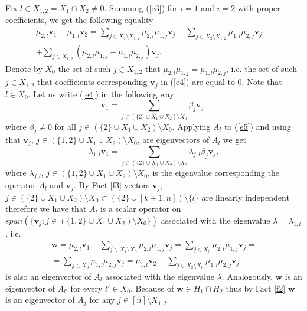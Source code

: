 \documentclass[12pt,nopagetitle]{article}
\theoremstyle{plain}
\theoremstyle{definition}
\begin{document}
Fix $l\in X_{1,2}=X_1\cap X_2\ne 0$. Summing (\ref{e3}) for $i=1$ and $i=2$ with proper coefficients, we get the following equality
\begin{multline}\label{e4}
		\mu_{2,l}\mathbf v_1 -\mu_{1,l}\mathbf v_2=\sum_{j\in X_1\setminus X_{1,2}} \mu_{2,l}\mu_{1,j} \mathbf v_j-\sum_{j\in X_2\setminus X_{1,2}} \mu_{1,l}\mu_{2,j} \mathbf v_j+\\
		+\sum_{j\in X_{1,2}}(\mu_{2,l}\mu_{1,j}-\mu_{1,l}\mu_{2,j}) \mathbf v_j.
\end{multline}
		Denote by $X_0$ the set of such $j\in X_{1,2}$ that $\mu_{2,l}\mu_{1,j}=\mu_{1,l}\mu_{2,j}$, i.e. the set of such $j\in X_{1,2}$ that coefficients corresponding $\mathbf v_j$ in (\ref{e4}) are equal to $0$. Note that $l\in X_0.$ 
		Let us write (\ref{e4}) in the following way
		\begin{equation}\label{e5}
		\mathbf v_1=\sum_{j\in (\{2\}\cup X_1\cup X_2)\setminus X_0} \beta_j \mathbf v_j,
		\end{equation}
		where $\beta_j\ne 0$ for all $j\in (\{2\}\cup X_1\cup X_2)\setminus X_0$. Applying $A_l$ to (\ref{e5}) and using that $\mathbf v_j$, $j\in (\{1,2\}\cup X_1\cup X_2)\setminus X_0$, are eigenvectors of $A_l$ we get
		$$\lambda_{1,l} \mathbf v_1=\sum_{j\in (\{2\}\cup X_1\cup X_2)\setminus X_0} \lambda_{j,l}\beta_j \mathbf v_j,$$
		where $\lambda_{j,l}$, $j\in (\{1,2\}\cup X_1\cup X_2)\setminus X_0$, is the eigenvalue corresponding the operator $A_l$ and $\mathbf v_j$.
		By Fact \ref{f3} vectors $\mathbf v_j$, $j\in (\{2\}\cup X_1\cup X_2)\setminus X_0\subset (\{2\}\cup [k+1,n])\setminus \{l\}$ are linearly independent therefore we have that
		$A_l$ is a scalar operator on $span (\{\mathbf v_j: j\in (\{1,2\}\cup X_1\cup X_2)\setminus X_0\})$ associated with the eigenvalue $\lambda=\lambda_{1,l}$, i.e.
\begin{gather*} 
\mathbf w=\mu_{2,l}\mathbf v_1 -\sum_{j\in X_1\setminus X_0} \mu_{2,l}\mu_{1,j}\mathbf v_j=\sum_{j\in X_0} \mu_{2,l}\mu_{1,j} \mathbf v_{j}=\\
=\sum_{j\in X_0} \mu_{1,l}\mu_{2,j} \mathbf v_{j}=
\mu_{1,l}\mathbf v_2 -\sum_{j\in X_2\setminus X_0} \mu_{1,l}\mu_{2,j}\mathbf v_j
\end{gather*}
is also an eigenvector of $A_l$ associated with the eigenvalue $\lambda$. Analogously, $\mathbf w$ is an eigenvector of $A_{l'}$ for every  $l'\in X_0$. Because of $\mathbf w\in H_1\cap H_2$ thus by Fact \ref{f2} $\mathbf w$ is an eigenvector of $A_j$ for any $j\in [n]\setminus X_{1,2}$. 
\end{document}
